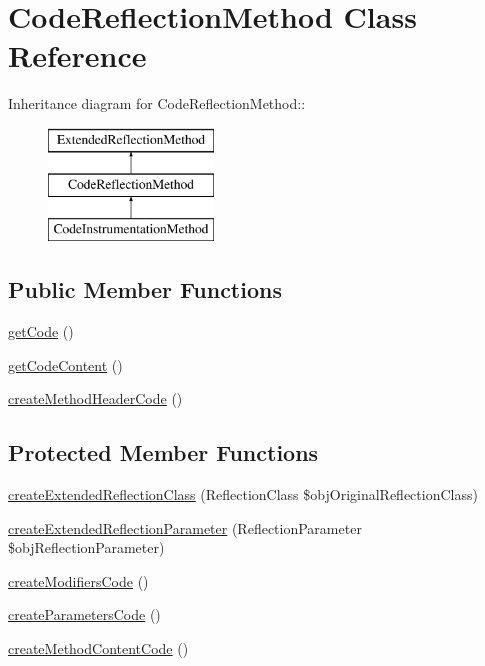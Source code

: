 \hypertarget{class_code_reflection_method}{
\section{CodeReflectionMethod Class Reference}
\label{class_code_reflection_method}
}
Inheritance diagram for CodeReflectionMethod::\begin{figure}[H]
\begin{center}
\leavevmode
\includegraphics[height=3cm]{class_code_reflection_method}
\end{center}
\end{figure}
\subsection*{Public Member Functions}
\begin{CompactItemize}
\item 
\hyperlink{class_code_reflection_method_9ea590fa1500f62805d106332634893e}{getCode} ()
\item 
\hyperlink{class_code_reflection_method_49ef51345ba44d4a0c9242794f7a97a2}{getCodeContent} ()
\item 
\hyperlink{class_code_reflection_method_c4b3d9a1c136135c42a66302f52c66c5}{createMethodHeaderCode} ()
\end{CompactItemize}
\subsection*{Protected Member Functions}
\begin{CompactItemize}
\item 
\hyperlink{class_code_reflection_method_84c20b140478480a3bbecda5e9e13702}{createExtendedReflectionClass} (ReflectionClass \$objOriginalReflectionClass)
\item 
\hyperlink{class_code_reflection_method_33a3dcd4331a02b37addbc2fa9281af6}{createExtendedReflectionParameter} (ReflectionParameter \$objReflectionParameter)
\item 
\hyperlink{class_code_reflection_method_f2457c6e356d735b29253563175d0523}{createModifiersCode} ()
\item 
\hyperlink{class_code_reflection_method_803892b766bfd1aba81f5e63ed248676}{createParametersCode} ()
\item 
\hyperlink{class_code_reflection_method_4aa609e822a988c2577185932cad79eb}{createMethodContentCode} ()
\end{CompactItemize}


